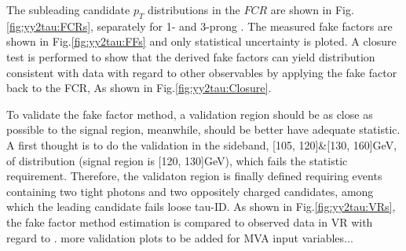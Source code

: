 The subleading \tauh candidate $p_{T}$ distributions in the $FCR$ are shown in Fig.\ref{fig:yy2tau:FCRs}, separately for 1- and 3-prong \tauh. The measured fake factors are shown in Fig.\ref{fig:yy2tau:FFs} and only statistical uncertainty is ploted. A closure test is performed to show that the derived fake factors can yield distribution consistent with data with regard to other observables by applying the fake factor back to the FCR, As shown in Fig.\ref{fig:yy2tau:Closure}.

To validate the fake factor method, a validation region should be as close as possible to the signal region, meanwhile, should be better have adequate statistic. A first thought is to do the validation in the sideband, [105, 120]\&[130, 160]GeV, of \myy distribution (signal region is [120, 130]GeV), which fails the statistic requirement. Therefore, the validaton region is finally defined requiring events containing two tight photons and two oppositely charged \tauh candidates, among which the leading \tauh candidate fails loose tau-ID. As shown in Fig.\ref{fig:yy2tau:VRs}, the fake factor method estimation is compared to observed data in VR with regard to \myy. more validation plots to be added for MVA input variables...

